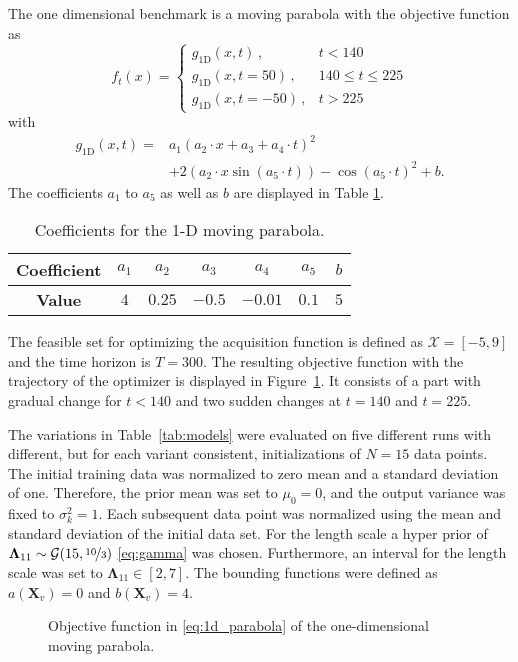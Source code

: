 The one dimensional benchmark is a moving parabola with the objective function as
\begin{equation}
    f_t(x) = \begin{cases}
        g_{\text{1D}}(x,t) \, ,& t < 140\\
        g_{\text{1D}}(x,t=50) \, ,&140 \leq t \leq 225 \\
        g_{\text{1D}}(x,t=-50)\, ,&t > 225
        \end{cases}
        \label{eq:1d_parabola}
\end{equation}
with
\begin{align}
    g_{\text{1D}}(x,t) =& a_1 (a_2 \cdot x + a_3 + a_4 \cdot t)^2 \nonumber\\&
    + 2(a_2 \cdot x \sin(a_5\cdot t)) - \cos(a_5\cdot t)^2 + b.
\end{align}
The coefficients $a_1$ to $a_5$ as well as $b$ are displayed in Table \ref{tab:coefficients_1D}.
\bgroup
\def\arraystretch{1.2}
\begin{table}[h]
    \centering
    \begin{tabular}{c||c c c c c c}
        \textbf{Coefficient} & $a_1$ &$a_2$&$a_3$&$a_4$&$a_5$&$b$ \\\hline\hline
        \textbf{Value} & $4$ &$0.25$&$-0.5$&$-0.01$&$0.1$&$5$
    \end{tabular}
    \caption{Coefficients for the 1-D moving parabola.}
    \label{tab:coefficients_1D}
\end{table}
\egroup

The feasible set for optimizing the acquisition function is defined as $\mathcal{X}=[-5, 9]$ and the time horizon is $T=300$. The resulting objective function with the trajectory of the optimizer is displayed in Figure~\ref{fig:Parabola1D}.
It consists of a part with gradual change for $t<140$ and two sudden changes at $t=140$ and $t=225$.

The variations in Table~\ref{tab:models} were evaluated on five different runs with different, but for each variant consistent, initializations of $N=15$ data points. The initial training data was normalized to zero mean and a standard deviation of one. Therefore, the prior mean was set to $\mu_0=0$, and the output variance was fixed to $\sigma_k^2=1$. Each subsequent data point was normalized using the mean and standard deviation of the initial data set. For the length scale a hyper prior of $\boldsymbol\Lambda_{11} \sim \mathcal{G}(15, \nicefrac{10}{3})$ \eqref{eq:gamma} was chosen. Furthermore, an interval for the length scale was set to $\boldsymbol\Lambda_{11} \in [2, 7]$. The bounding functions were defined as $a(\mathbf{X}_v)=0$ and $b(\mathbf{X}_v)=4$.
\begin{figure}[h]
    \centering
    
    \caption[Objective function of the one-dimensional moving parabola.]{Objective function in \eqref{eq:1d_parabola} of the one-dimensional moving parabola.}
    \label{fig:Parabola1D}
\end{figure}

